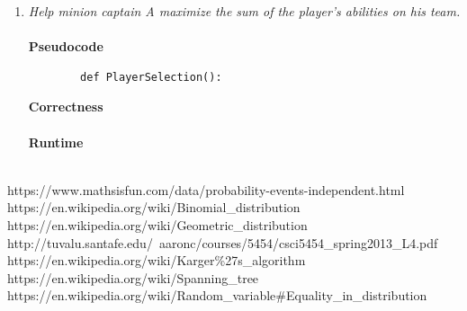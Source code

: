 \documentclass[12pt]{article}
\begin{document}
\begin{enumerate}
		\newpage
		\item \textit{Help minion captain A maximize the sum of the player's abilities on his team.}\\
		\\
		\textbf{Pseudocode}\\
		\begin{verbatim}
		def PlayerSelection():
		\end{verbatim}
		\textbf{Correctness}\\
		\\
		\textbf{Runtime}\\
		\\

\end{enumerate}

\newpage
\begin{thebibliography}{10}
	 https://www.mathsisfun.com/data/probability-events-independent.html
	 https://en.wikipedia.org/wiki/Binomial\_distribution
	 https://en.wikipedia.org/wiki/Geometric\_distribution
     http://tuvalu.santafe.edu/~aaronc/courses/5454/csci5454\_spring2013\_L4.pdf
     https://en.wikipedia.org/wiki/Karger\%27s\_algorithm
     https://en.wikipedia.org/wiki/Spanning\_tree
     https://en.wikipedia.org/wiki/Random\_variable\#Equality\_in\_distribution
\end{thebibliography}
\end{document}
